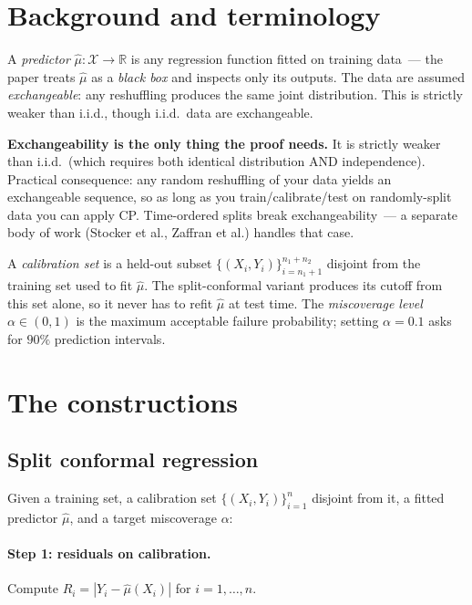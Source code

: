 \documentclass[letterpaper,11pt,leqno]{article}
\begin{document}
\section{Background and terminology}\label{s:background}

A \emph{predictor} $\hat{\mu}: \mathcal{X} \to \mathbb{R}$ is any regression function fitted on training data~--- the paper treats $\hat{\mu}$ as a \emph{black box} and inspects only its outputs. The data are assumed \emph{exchangeable}: any reshuffling produces the same joint distribution. This is strictly weaker than i.i.d., though i.i.d.\ data are exchangeable.

\begin{definitionexplain}
\textbf{Exchangeability is the only thing the proof needs.} It is strictly weaker than i.i.d.~(which requires both identical distribution AND independence). Practical consequence: any random reshuffling of your data yields an exchangeable sequence, so as long as you train/calibrate/test on randomly-split data you can apply CP. Time-ordered splits break exchangeability~--- a separate body of work (Stocker et al., Zaffran et al.) handles that case.
\end{definitionexplain}

A \emph{calibration set} is a held-out subset $\{(X_i, Y_i)\}_{i=n_1+1}^{n_1+n_2}$ disjoint from the training set used to fit $\hat{\mu}$. The split-conformal variant produces its cutoff from this set alone, so it never has to refit $\hat{\mu}$ at test time. The \emph{miscoverage level} $\alpha \in (0,1)$ is the maximum acceptable failure probability; setting $\alpha = 0.1$ asks for $90\%$ prediction intervals.

\section{The constructions}\label{s:construction}

\subsection*{Split conformal regression}

Given a training set, a calibration set $\{(X_i, Y_i)\}_{i=1}^{n}$ disjoint from it, a fitted predictor $\hat{\mu}$, and a target miscoverage $\alpha$:

\paragraph{Step 1: residuals on calibration.} Compute $R_i = |Y_i - \hat{\mu}(X_i)|$ for $i = 1, \dots, n$.
\end{document}
